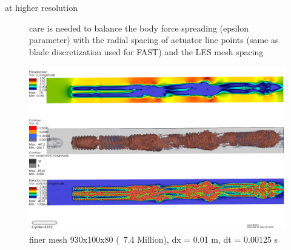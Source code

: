 \documentclass[xcolor=x11names,compress]{beamer}
\begin{document}
	\begin{frame}{at higher resolution}

		\begin{figure}[p]
		    \centering
    		
    		\small care is needed to balance the body force spreading (epsilon parameter) with the 
    		radial spacing of actuator line points (same as blade discretization used for FAST)
    		and the LES mesh spacing

    		\includegraphics[width=1.05\textwidth]{figures/fastFlume__Turbines=3_TSR=6p2_Layout=offset_Mesh=fine_v0001.png}
		    \caption{\scriptsize{finer mesh 930x100x80 (~7.4 Million), dx = 0.01 m, dt = 0.00125 s}}
		\end{figure}

	\end{frame}





\end{document}
